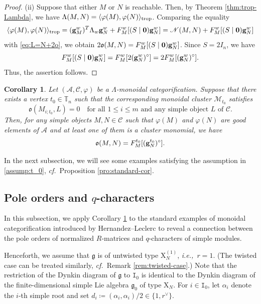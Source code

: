 \documentclass[12pt]{amsart}
\newtheorem{corollary}[theorem]{Corollary}
\theoremstyle{definition}
\theoremstyle{remark}
\numberwithin{equation}{section}
\newcommand{\ie}{\textit{i.e.,}\ }
\newcommand{\confer}{\textit{cf.}\ }
\begin{document}
\begin{proof}
(ii) Suppose that either $M$ or $N$ is reachable. Then, by Theorem \ref{thm:trop-Lambda}, we have $\Lambda(M,N)=\langle \varphi(M),\varphi(N)\rangle_{\rm trop}$.
Comparing the equality
\[
\langle \varphi(M),\varphi(N)\rangle_{\rm trop}=({\bf g}_M^w)^T\Lambda_w{\bf g}_N^w+F_{M}^{w}[(S\mid {\bf 0}){\bf g}^{w}_N]= \mathscr{N}(M,N) + F_{M}^{w}[(S\mid {\bf 0}){\bf g}^{w}_N]\]
with \eqref{eq:L=N+2o},  we obtain $2\mathfrak{o}(M,N)=F_{M}^{w}[(S\mid {\bf 0}){\bf g}^{w}_N]$.
Since $S = 2 I_n$, we have 
\[F_M^{w}[(S\mid {\bf 0}){\bf g}^{w}_N] = F_M^{w}[2 ({\bf g}^w_N)^\circ] = 2 F_M^{w}[({\bf g}^w_N)^\circ].\]
Thus, the assertion follows.
\end{proof}

\begin{corollary} \label{Cor:o=Fg=E}
Let $(\mathcal{A}, \mathcal{C}, \varphi)$ be a $\mathsf{\Lambda}$-monoidal categorification. Suppose that there exists a vertex $t_0 \in \mathbb{T}_n$ such that the corresponding monoidal cluster $\mathcal{M}_{t_0}$ satisfies
\begin{equation}\label{assump:t_0}
\mathfrak{o}(M_{i;t_0}, L) =0 
\quad \text{for all $1 \le i \le m$ and any simple object $L$ of $\mathcal{C}$.}
\end{equation}
Then, for any simple objects $M, N \in \mathcal{C}$ such that $\varphi(M)$ and $\varphi(N)$ are good elements of $\mathcal{A}$ and at least one of them is a cluster monomial, we have
\begin{equation} \label{eq:o=Fg}
\mathfrak{o}(M,N) = F_{M}^{t_0}[({\bf g}^{t_0}_N)^\circ].
\end{equation}
\end{corollary}
In the next subsection, we will see some examples satisfying the assumption in \eqref{assump:t_0}, \confer Proposition \ref{pro:standard-cor}. 
\subsection{Pole orders and $q$-characters}\label{subsec:staex}
In this subsection, we apply Corollary \ref{Cor:o=Fg=E} to the standard examples of monoidal categorification introduced by Hernandez--Leclerc \cite{HL_2010, HL16} to reveal a connection between the pole orders of normalized $R$-matrices and $q$-characters of simple modules.

Henceforth, we assume that $\mathfrak{g}$ is of untwisted type $\mathrm{X}_N^{(1)}$,  \ie $r=1$. (The twisted case can be treated similarly, \confer Remark \ref{rem:twisted-case}.)
Note that the restriction of the Dynkin diagram of $\mathfrak{g}$ to $\mathtt{I}_0$ is identical to the Dynkin diagram of the finite-dimensional simple Lie algebra $\mathfrak{g}_0$ of type $\mathrm{X}_N$. 
For $i \in \mathtt{I}_0$, let $\alpha_i$ denote the $i$-th simple root and set $d_i \coloneqq (\alpha_i, \alpha_i)/2 \in \{1,r^\vee\}$. 
\end{document}
